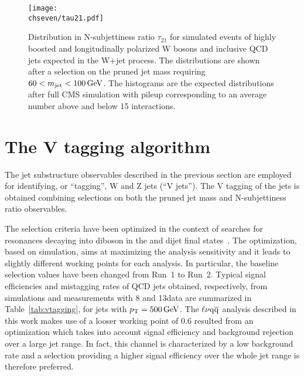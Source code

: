 \begin{figure}[!htb]
 \begin{center}
  \texttt{[image: \\chseven/tau21.pdf]}
 \end{center}
 \caption{\small Distribution in N-subjettiness ratio $\tau_{21}$ for simulated events of highly boosted and longitudinally polarized W bosons and inclusive QCD jets expected in the W+jet process. The distributions are shown after a selection on the pruned jet mass requiring $60 < m_{\text{jet}} < 100\,\text{Ge\hspace{-.08em}V}$. The histograms are the expected distributions after full CMS simulation with pileup corresponding to an average number above and below 15 interactions.
 }
 \label{fig:tau21}
\end{figure}

\section{The V tagging algorithm}
\label{sec:vtagging}

The jet substructure observables described in the previous section are employed for identifying, or ``tagging'', W and Z jets (``V jets''). The V tagging of the jets is obtained combining selections on both the pruned jet mass \mJ and N-subjettiness ratio \nsubj observables. %

The selection criteria have been optimized in the context of searches for resonances decaying into diboson in the \lnujet and dijet final states~\cite{Khachatryan:2014gha,Khachatryan:2014hpa,CMS-PAS-EXO-15-002}. The optimization, based on simulation, aims at maximizing the analysis sensitivity and it leads to slightly different working points for each analysis. In particular, the baseline selection values have been changed from Run~1 to Run~2. Typical signal efficiencies and mistagging rates of QCD jets obtained, respectively, from simulations and measurements with 8 and 13\TeV data are summarized in Table~\ref{tab:vtagging}, for jets with $p_{\mathrm{T}} = 500\,\text{Ge\hspace{-.08em}V}$.
The $\ell\nu\mathrm{q}\overline{\mathrm{q}}$ analysis described in this work makes use of a looser \nsubj working point of 0.6 resulted from an optimization which takes into account signal efficiency and background rejection over a large jet \pt range.
In fact, this channel is characterized by a low background rate and a \nsubj selection providing a higher signal efficiency over the whole jet \pt range is therefore preferred.\\

